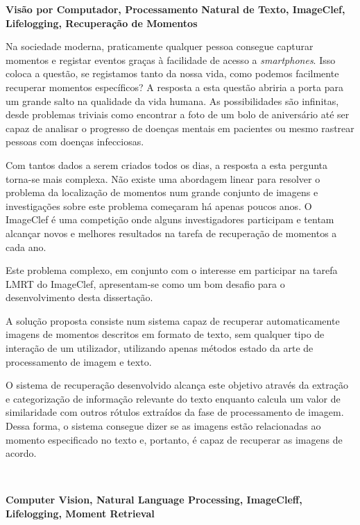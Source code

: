 \TitlePage
  \vspace*{55mm}
       {\textbf{Visão por Computador, Processamento Natural de Texto, ImageClef, Lifelogging, Recuperação de Momentos}}

          
      {Na sociedade moderna, praticamente qualquer pessoa consegue capturar momentos e registar eventos graças à facilidade de acesso a \textit{smartphones}. Isso coloca a questão, se registamos tanto da nossa vida, como podemos facilmente recuperar momentos específicos? A resposta a esta questão abriria a porta para um grande salto na qualidade da vida humana. As possibilidades são infinitas, desde problemas triviais como encontrar a foto de um bolo de aniversário até ser capaz de analisar o progresso de doenças mentais em pacientes ou mesmo rastrear pessoas com doenças infecciosas.}

     \TEXT{}
     {Com tantos dados a serem criados todos os dias, a resposta a esta pergunta torna-se mais complexa. Não existe uma abordagem linear para resolver o problema da localização de momentos num grande conjunto de imagens e investigações sobre este problema começaram há apenas poucos anos. O ImageClef é uma competição onde alguns investigadores participam e tentam alcançar novos e melhores resultados na tarefa de recuperação de momentos a cada ano.}

     \TEXT{}
     {Este problema complexo, em conjunto com o interesse em participar na tarefa LMRT do ImageClef, apresentam-se como um bom desafio para o desenvolvimento desta dissertação.}

     \TEXT{}
     {A solução proposta consiste num sistema capaz de recuperar automaticamente imagens de momentos descritos em formato de texto, sem qualquer tipo de interação de um utilizador, utilizando apenas métodos estado da arte de processamento de imagem e texto.} 

     \TEXT{}
     {O sistema de recuperação desenvolvido alcança este objetivo através da extração e categorização de informação relevante do texto enquanto calcula um valor de similaridade com outros rótulos extraídos da fase de processamento de imagem. Dessa forma, o sistema consegue dizer se as imagens estão relacionadas ao momento especificado no texto e, portanto, é capaz de recuperar as imagens de acordo.
     }


\EndTitlePage
\titlepage\ \endtitlepage %

\TitlePage
  \vspace*{55mm}
       {\textbf{Computer Vision, Natural Language Processing, ImageCleff, Lifelogging, Moment Retrieval}}

